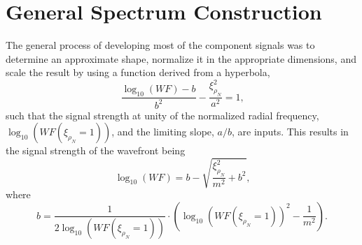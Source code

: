 \section{General Spectrum Construction}
The general process of developing most of the component signals was to determine an approximate shape, normalize it in the appropriate dimensions, and scale the result by using a function derived from a hyperbola,
\begin{equation}
 \frac{\log_{10}(WF)-b}{b^2}-\frac{\xi_{\rho_N}^2}{a^2} = 1 \textrm{,}
 \label{eqn:05_scaling_hyperbola}
\end{equation}
such that the signal strength at unity of the normalized radial frequency, $\log_{10}(WF(\xi_{\rho_N}=1))$, and the limiting slope, $a/b$, are inputs.
This results in the signal strength of the wavefront being
\begin{equation}
 \log_{10}(WF) = b-\sqrt{\frac{\xi_{\rho_N}^2}{m^2}+b^2} \textrm{,}
 \label{eqn:05_wavefront_strength}
\end{equation}
where
\begin{equation}
 b = \frac{1}{2\log_{10}(WF(\xi_{\rho_N}=1))}\cdot\left(\log_{10}(WF(\xi_{\rho_N}=1))^2-\frac{1}{m^2}\right) \textrm{.}
 \label{eqn:05_wavefront_strength_b}
\end{equation}

